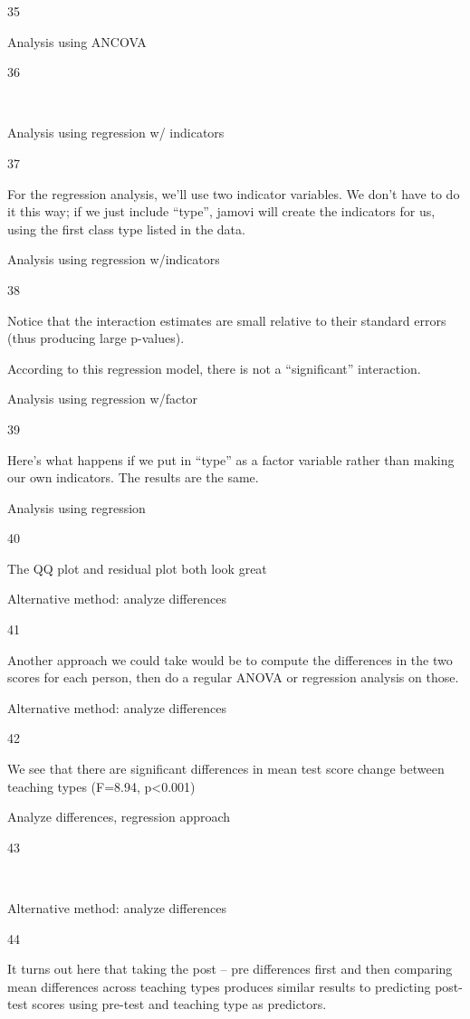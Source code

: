 \documentclass[
  letterpaper,
  DIV=11,
  numbers=noendperiod]{scrreprt}
\begin{document}
35

Analysis using ANCOVA

36

~

Analysis using regression w/ indicators

37

For the regression analysis, we'll use two indicator variables. We don't
have to do it this way; if we just include ``type'', jamovi will create
the indicators for us, using the first class type listed in the data.

Analysis using regression w/indicators

38

Notice that the interaction estimates are small relative to their
standard errors (thus producing large p-values).

According to this regression model, there is not a ``significant''
interaction.

Analysis using regression w/factor

39

Here's what happens if we put in ``type'' as a factor variable rather
than making our own indicators. The results are the same.

Analysis using regression

40

The QQ plot and residual plot both look great

Alternative method: analyze differences

41

Another approach we could take would be to compute the differences in
the two scores for each person, then do a regular ANOVA or regression
analysis on those.

Alternative method: analyze differences

42

We see that there are significant differences in mean test score change
between teaching types (F=8.94, p\textless0.001)

Analyze differences, regression approach

43

~

Alternative method: analyze differences

44

It turns out here that taking the post -- pre differences first and then
comparing mean differences across teaching types produces similar
results to predicting post-test scores using pre-test and teaching type
as predictors.
\end{document}
